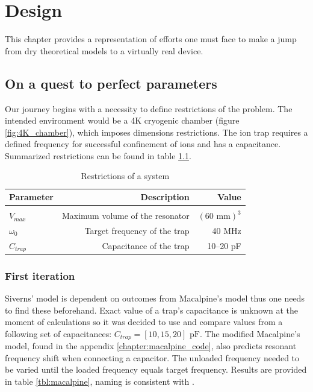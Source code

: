 \chapter{Design}
This chapter provides a representation of efforts one must face to make a jump from dry theoretical models to a virtually real device.

\section{On a quest to perfect parameters}
Our journey begins with a necessity to define restrictions of the problem. The intended environment would be a 4K cryogenic chamber (figure \ref{fig:4K_chamber}), which imposes dimensions restrictions. The ion trap requires a defined frequency for successful confinement of ions and has a capacitance. Summarized restrictions can be found in table \ref{tbl:restrictions}.

\begin{table}[h]
\centering
\begin{tabular}{| l | r | r |}
	\hline
	Parameter & Description & Value \\
	\hline \hline
	&&\\[-1em]
	$V_{max}$ & Maximum volume of the resonator & $\left( 60\text{ mm} \right)^3$ \\[5pt]
	\hline
	$\omega_0$ & Target frequency of the trap & 40 MHz \\
	\hline
	$C_{trap}$ & Capacitance of the trap & 10--20 pF \\
	\hline
\end{tabular}	
\caption{Restrictions of a system}
\label{tbl:restrictions}
\end{table}

\subsection{First iteration}
Siverns' model \cite{Siverns2012} is dependent on outcomes from Macalpine's model \cite{Macalpine2000} thus one needs to find these beforehand. Exact value of a trap's capacitance is unknown at the moment of calculations so it was decided to use and compare values from a following set of capacitances: $C_{trap} = [10, 15, 20]\text{ pF}$. The modified Macalpine's model, found in the appendix \ref{chapter:macalpine_code}, also predicts resonant frequency shift when connecting a capacitor. The unloaded frequency needed to be varied until the loaded frequency equals target frequency. Results are provided in table \ref{tbl:macalpine}, naming is consistent with \cite{Macalpine2000}.

